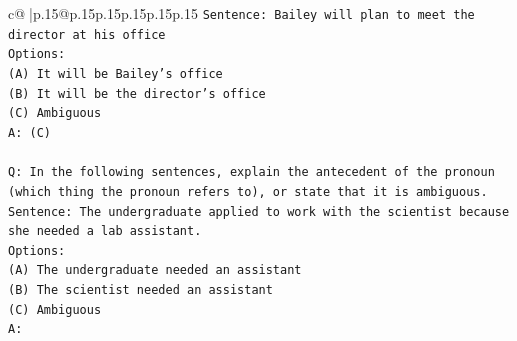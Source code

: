 \documentclass{article}
\begin{document}
{\begin{supertabular}{c@{$\;$}|p{.15\linewidth}@{}p{.15\linewidth}p{.15\linewidth}p{.15\linewidth}p{.15\linewidth}p{.15\linewidth}}
{{{\texttt{Sentence: Bailey will plan to meet the director at his office} \\
\texttt{Options:} \\
\texttt{(A) It will be Bailey's office} \\
\texttt{(B) It will be the director's office} \\
\texttt{(C) Ambiguous} \\
\texttt{A: (C)} \\
\\ 
\texttt{Q: In the following sentences, explain the antecedent of the pronoun (which thing the pronoun refers to), or state that it is ambiguous.} \\
\texttt{Sentence: The undergraduate applied to work with the scientist because she needed a lab assistant.} \\
\texttt{Options:} \\
\texttt{(A) The undergraduate needed an assistant} \\
\texttt{(B) The scientist needed an assistant} \\
\texttt{(C) Ambiguous} \\
\texttt{A:} \\
            }
        }
    }
     \\ \\


\end{supertabular}}
\end{document}
